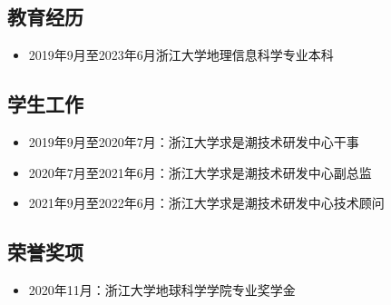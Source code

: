 \cleardoublepage
{}

\subsection{教育经历}
\begin{itemize}
    \item 2019年9月至2023年6月\quad 浙江大学地理信息科学专业\quad 本科
\end{itemize}

\subsection{学生工作}
\begin{itemize}
    \item 2019年9月至2020年7月：浙江大学求是潮技术研发中心\quad 干事
    \item 2020年7月至2021年6月：浙江大学求是潮技术研发中心\quad 副总监
    \item 2021年9月至2022年6月：浙江大学求是潮技术研发中心\quad 技术顾问
\end{itemize}

\subsection{荣誉奖项}
\begin{itemize}
  \item 2020年11月：浙江大学地球科学学院专业奖学金
\end{itemize}